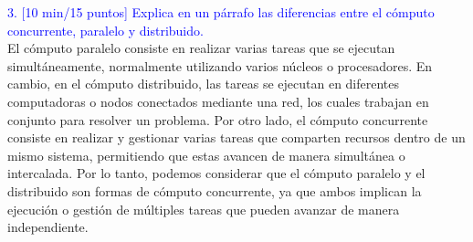 \textcolor{blue}{3. [10 min/15 puntos] Explica en un párrafo las diferencias entre el cómputo concurrente, paralelo
y distribuido.}\\

El cómputo paralelo consiste en realizar varias tareas que se ejecutan simultáneamente, normalmente utilizando varios núcleos o procesadores. En cambio, en el cómputo distribuido, las tareas se ejecutan en diferentes computadoras o nodos conectados mediante una red, los cuales trabajan en conjunto para resolver un problema. Por otro lado, el cómputo concurrente consiste en realizar y gestionar varias tareas que comparten recursos dentro de un mismo sistema, permitiendo que estas avancen de manera simultánea o intercalada. Por lo tanto, podemos considerar que el cómputo paralelo y el distribuido son formas de cómputo concurrente, ya que ambos implican la ejecución o gestión de múltiples tareas que pueden avanzar de manera independiente.\\
